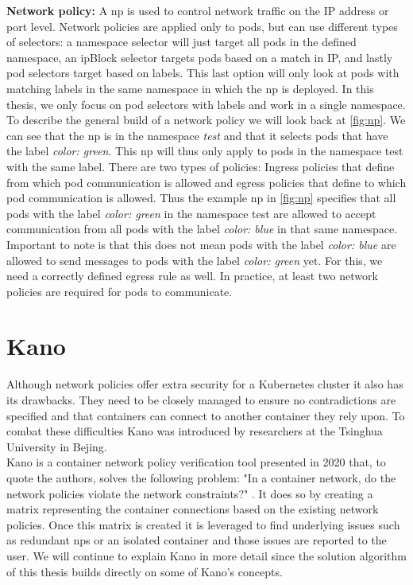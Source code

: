\textbf{Network policy:} \label{comp:networkpolicy} A \acrfull{np} is used to control network traffic on the IP address or port level. Network policies are applied only to pods, but can use different types of selectors: a namespace selector will just target all pods in the defined namespace, an ipBlock selector targets pods based on a match in IP, and lastly pod selectors target based on labels. This last option will only look at pods with matching labels in the same namespace in which the \acrshort{np} is deployed. In this thesis, we only focus on pod selectors with labels and work in a single namespace.
\\[10pt]
To describe the general build of a network policy we will look back at \autoref{fig:np}. We can see that the \acrshort{np} is in the namespace \textit{test} and that it selects pods that have the label \textit{color: green}. This \acrshort{np} will thus only apply to pods in the namespace test with the same label. There are two types of policies: Ingress policies that define from which pod communication is allowed and egress policies that define to which pod communication is allowed. Thus the example \acrshort{np} in \autoref{fig:np} specifies that all pods with the label \textit{color: green} in the namespace test are allowed to accept communication from all pods with the label \textit{color: blue} in that same namespace.
\\[10pt]


Important to note is that this does not mean pods with the label \textit{color: blue} are allowed to send messages to pods with the label \textit{color: green} yet. For this, we need a correctly defined egress rule as well. In practice, at least two network policies are required for pods to communicate. \cite{k8snp}



\section{Kano}\label{sec:kano}
Although network policies offer extra security for a Kubernetes cluster it also has its drawbacks. They need to be closely managed to ensure no contradictions are specified and that containers can connect to another container they rely upon. To combat these difficulties Kano was introduced by researchers at the Tsinghua University in Bejing.
\\[10pt]
Kano is a container network policy verification tool presented in 2020 that, to quote the authors, solves the following problem: "In a container network, do the network
policies violate the network constraints?" \cite{kano}. It does so by creating a matrix representing the container connections based on the existing network policies. Once this matrix is created it is leveraged to find underlying issues such as redundant \acrshort{np}s or an isolated container and those issues are reported to the user. We will continue to explain Kano in more detail since the solution algorithm of this thesis builds directly on some of Kano's concepts.
\\[10pt]

